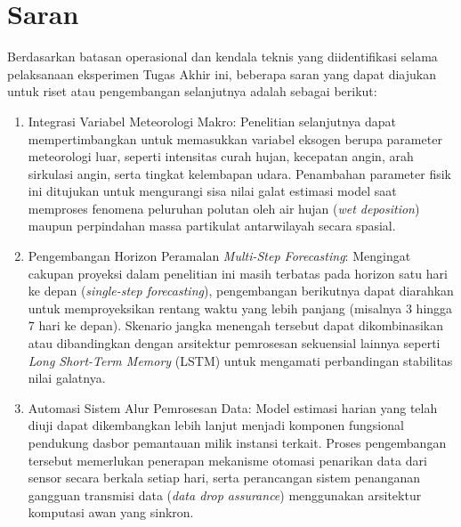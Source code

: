 \section{Saran}
Berdasarkan batasan operasional dan kendala teknis yang diidentifikasi selama pelaksanaan eksperimen Tugas Akhir ini, beberapa saran yang dapat diajukan untuk riset atau pengembangan selanjutnya adalah sebagai berikut:

\begin{enumerate}
    \item {Integrasi Variabel Meteorologi Makro:} Penelitian selanjutnya dapat mempertimbangkan untuk memasukkan variabel eksogen berupa parameter meteorologi luar, seperti intensitas curah hujan, kecepatan angin, arah sirkulasi angin, serta tingkat kelembapan udara. Penambahan parameter fisik ini ditujukan untuk mengurangi sisa nilai galat estimasi model saat memproses fenomena peluruhan polutan oleh air hujan (\textit{wet deposition}) maupun perpindahan massa partikulat antarwilayah secara spasial.
    \item {Pengembangan Horizon Peramalan \textit{Multi-Step Forecasting}:} Mengingat cakupan proyeksi dalam penelitian ini masih terbatas pada horizon satu hari ke depan (\textit{single-step forecasting}), pengembangan berikutnya dapat diarahkan untuk memproyeksikan rentang waktu yang lebih panjang (misalnya 3 hingga 7 hari ke depan). Skenario jangka menengah tersebut dapat dikombinasikan atau dibandingkan dengan arsitektur pemrosesan sekuensial lainnya seperti \textit{Long Short-Term Memory} (LSTM) untuk mengamati perbandingan stabilitas nilai galatnya.
    \item {Automasi Sistem Alur Pemrosesan Data:} Model estimasi harian yang telah diuji dapat dikembangkan lebih lanjut menjadi komponen fungsional pendukung dasbor pemantauan milik instansi terkait. Proses pengembangan tersebut memerlukan penerapan mekanisme otomasi penarikan data dari sensor secara berkala setiap hari, serta perancangan sistem penanganan gangguan transmisi data (\textit{data drop assurance}) menggunakan arsitektur komputasi awan yang sinkron.
\end{enumerate}